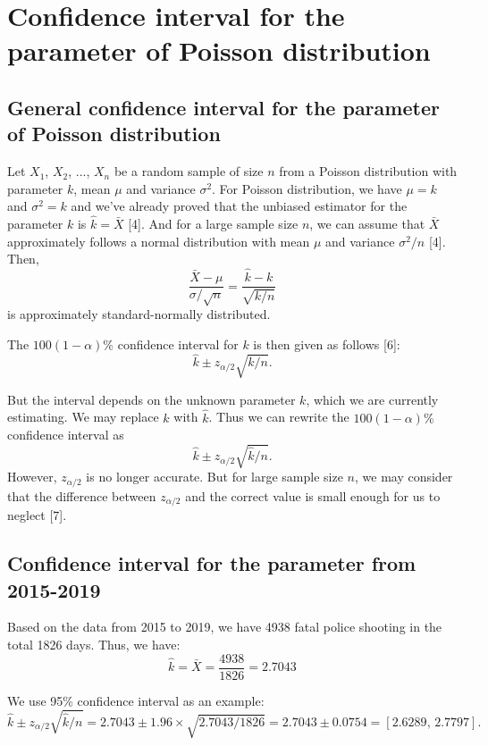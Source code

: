 \documentclass[a4paper]{article}
\begin{document}
\section{Confidence interval for the parameter of Poisson distribution}
	\subsection{General confidence interval for the parameter of Poisson distribution}
	Let $X_1$, $X_2$, ..., $X_n$ be a random sample of size $n$ from a Poisson distribution with parameter $k$, mean $\mu$ and variance $\sigma^2$. For Poisson distribution, we have $\mu=k$ and $\sigma^2=k$ and we've already proved that the unbiased estimator for the parameter $k$ is $\hat{k}=\bar{X}$ [4]. And for a large sample size $n$, we can assume that $\bar{X}$ approximately follows a normal distribution with mean $\mu$ and variance $\sigma^2/n$ [4]. Then, $$\frac{\bar{X}-\mu}{\sigma/\sqrt{n}}=\frac{\hat{k}-k}{\sqrt{k/n}}$$ is approximately standard-normally distributed.

	The $100(1-\alpha)\%$ confidence interval for $k$ is then given as follows [6]: $$\hat{k}\pm z_{\alpha/2}\sqrt{k/n}.$$
	
	But the interval depends on the unknown parameter $k$, which we are currently estimating. We may replace $k$ with $\hat{k}$. Thus we can rewrite the $100(1-\alpha)\%$ confidence interval as $$\hat{k}\pm z_{\alpha/2}\sqrt{\hat{k}/n}.$$ However, $z_{\alpha/2}$ is no longer accurate. But for large sample size $n$, we may consider that the difference between $z_{\alpha/2}$ and the correct value is small enough for us to neglect [7].
	\subsection{Confidence interval for the parameter from 2015-2019}
	Based on the data from 2015 to 2019, we have 4938 fatal police shooting in the total 1826 days. Thus, we have: $$\hat{k}=\bar{X}=\frac{4938}{1826}=2.7043$$

	We use 95\% confidence interval as an example: $$\hat{k}\pm z_{\alpha/2}\sqrt{\hat{k}/n}=2.7043\pm1.96\times\sqrt{2.7043/1826}=2.7043\pm0.0754=[2.6289,\, 2.7797].$$
\end{document}
